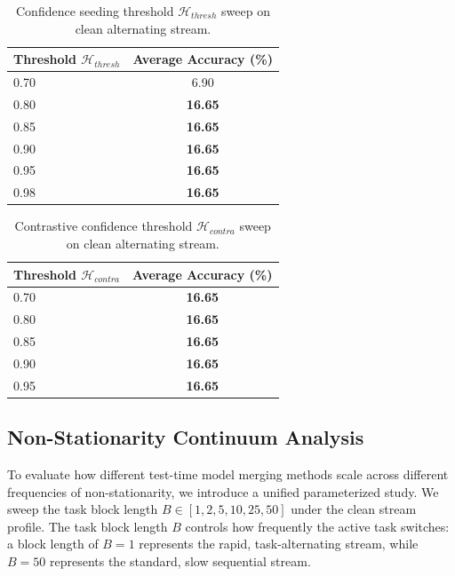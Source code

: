 \documentclass{article}
\theoremstyle{plain}
\theoremstyle{definition}
\theoremstyle{remark}
\begin{document}
\begin{table}[h]
\caption{Confidence seeding threshold $\mathcal{H}_{thresh}$ sweep on clean alternating stream.}
\label{tab:thresh_sweep}
\begin{center}
\begin{small}
\begin{tabular}{lc}
\toprule
Threshold $\mathcal{H}_{thresh}$ & Average Accuracy (\%) \\
\midrule
0.70 & 6.90 \\
0.80 & \textbf{16.65} \\
0.85 & \textbf{16.65} \\
0.90 & \textbf{16.65} \\
0.95 & \textbf{16.65} \\
0.98 & \textbf{16.65} \\
\bottomrule
\end{tabular}
\end{small}
\end{center}
\end{table}

\begin{table}[h]
\caption{Contrastive confidence threshold $\mathcal{H}_{contra}$ sweep on clean alternating stream.}
\label{tab:contra_sweep}
\begin{center}
\begin{small}
\begin{tabular}{lc}
\toprule
Threshold $\mathcal{H}_{contra}$ & Average Accuracy (\%) \\
\midrule
0.70 & \textbf{16.65} \\
0.80 & \textbf{16.65} \\
0.85 & \textbf{16.65} \\
0.90 & \textbf{16.65} \\
0.95 & \textbf{16.65} \\
\bottomrule
\end{tabular}
\end{small}
\end{center}
\end{table}

\subsection{Non-Stationarity Continuum Analysis}
\label{subsec:continuum}

To evaluate how different test-time model merging methods scale across different frequencies of non-stationarity, we introduce a unified parameterized study. We sweep the task block length $B \in [1, 2, 5, 10, 25, 50]$ under the clean stream profile. The task block length $B$ controls how frequently the active task switches: a block length of $B=1$ represents the rapid, task-alternating stream, while $B=50$ represents the standard, slow sequential stream.
\end{document}
